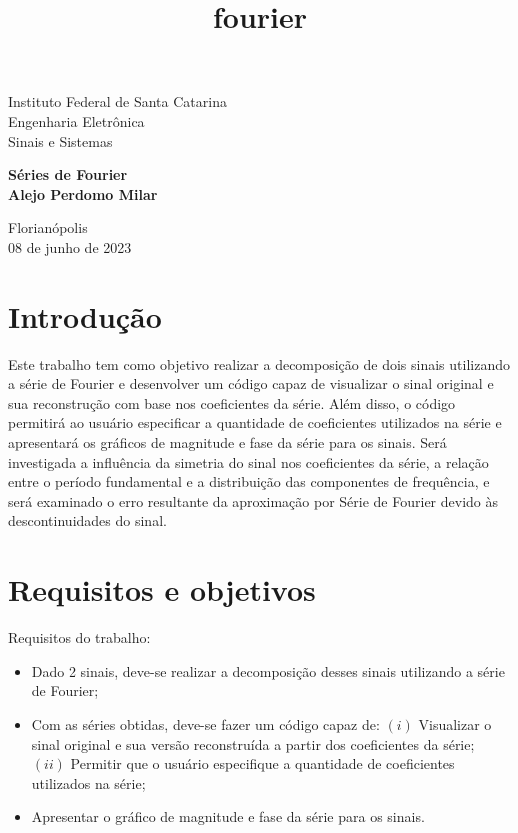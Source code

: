 \documentclass{article}
\title{fourier}
\begin{document}
    
        
    \begin{titlepage}
    	\begin{center}
    		\vspace*{1cm}
    		
    		
    		
    		\vspace{0.5cm}
    		\Large{Instituto Federal de Santa Catarina\\
    		Engenharia Eletrônica\\
    		Sinais e Sistemas}
    		
    		\vspace{5.5cm}
    		
    		\textbf{Séries de Fourier}\\
    		\textbf{Alejo Perdomo Milar}
    		
    		\vfill
    		
    		Florianópolis\\
    		08 de junho de 2023
    		
    	\end{center}
    \end{titlepage}


    \hypertarget{introduuxe7uxe3o}{%
\section{Introdução}\label{introduuxe7uxe3o}}

Este trabalho tem como objetivo realizar a decomposição de dois sinais
utilizando a série de Fourier e desenvolver um código capaz de
visualizar o sinal original e sua reconstrução com base nos coeficientes
da série. Além disso, o código permitirá ao usuário especificar a
quantidade de coeficientes utilizados na série e apresentará os gráficos
de magnitude e fase da série para os sinais. Será investigada a
influência da simetria do sinal nos coeficientes da série, a relação
entre o período fundamental e a distribuição das componentes de
frequência, e será examinado o erro resultante da aproximação por Série
de Fourier devido às descontinuidades do sinal.

\hypertarget{requisitos-e-objetivos}{%
\section{Requisitos e objetivos}\label{requisitos-e-objetivos}}

Requisitos do trabalho:
\begin{itemize}
	\item Dado 2 sinais, deve-se realizar a decomposição
	desses sinais utilizando a série de Fourier;
	\item Com as séries obtidas, deve-se fazer um código capaz de: $(i)$ Visualizar o sinal original e sua
	versão reconstruída a partir dos coeficientes da série; $(ii)$ Permitir que o
	usuário especifique a quantidade de coeficientes utilizados na série;
	\item Apresentar o gráfico de magnitude e fase da série para os sinais.
\end{itemize}
\end{document}
